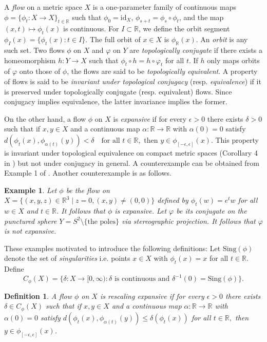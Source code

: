 \documentclass[11pt,letterpaper]{amsart}
\newtheorem{definition}{Definition}[section]
\newtheorem{ex}{Example}[section]
\begin{document}
A {\em flow} on a metric space $X$ is a one-parameter family of continuous maps $\phi = \{\phi_t : X \to X\}_{t \in \mathbb{R}}$ such that $\phi_0 = \mathrm{id}_X$, $\phi_{s+t} = \phi_s \circ \phi_t$, and the map $(x, t) \mapsto \phi_t(x)$ is continuous. For $I \subset \mathbb{R}$, we define the orbit segment $\phi_I(x) = \{\phi_t(x) : t \in I\}$. The full orbit of $x \in X$ is $\phi_{\mathbb{R}}(x)$. An {\em orbit} is any such set.
Two flows $\phi$ on $X$ and $\varphi$ on $Y$ are {\em topologically conjugate} if there exists a homeomorphism $h : Y \to X$ such that $\phi_t \circ h = h \circ \varphi_t$ for all $t$. If $h$ only maps orbits of $\varphi$ onto those of $\phi$, the flows are said to be {\em topologically equivalent}.
A property of flows is said to be {\em invariant under topological conjugacy} (resp. {\em equivalence}) if it is preserved under topologically conjugate (resp. equivalent) flows. Since conjugacy implies equivalence, the latter invariance implies the former.

On the other hand, a flow $\phi$ on $X$ is {\em expansive} if for every $\epsilon > 0$ there exists $\delta > 0$ such that if $x, y \in X$ and a continuous map $\alpha : \mathbb{R} \to \mathbb{R}$ with $\alpha(0) = 0$ satisfy
$d(\phi_t(x), \phi_{\alpha(t)}(y)) < \delta \quad \text{for all } t\in\mathbb{R},$
then $y \in \phi_{[-\epsilon,\epsilon]}(x)$. This property is invariant under topological equivalence on compact metric spaces (Corollary 4 in \cite{bw}) but not under conjugacy in general. A counterexample can be obtained from Example 1 of \cite{jny}. Another counterexample is as follows.

\begin{ex}
\label{jimmy}
Let $\phi$ be the flow on $X=\{(x,y,z)\in \mathbb{R}^3\mid z=0, (x,y)\neq(0,0)\}$ defined by $\phi_t(w) = e^tw$ for all $w\in X$ and $t\in\mathbb{R}$.
It follows that $\phi$ is expansive.
Let $\varphi$ be its conjugate on the punctured sphere $Y = S^2 \setminus \{\mbox{the poles}\}$ via stereographic projection. It follows that $\varphi$ is not expansive.
\end{ex}

These examples motivated \cite{jny} to introduce the following definitions:
Let $\mathrm{Sing}(\phi)$ denote the set of {\em singularities} i.e. points $x\in X$ with $\phi_t(x)=x$ for all $t\in\mathbb{R}$. Define
$$
C_\phi(X) = \{ \delta:X\to [0,\infty): \delta\mbox{ is continuous and }\delta^{-1}(0) = \mathrm{Sing}(\phi) \}.
$$
\begin{definition}
A flow $\phi$ on $X$ is {\em rescaling expansive} if
for every $\epsilon > 0$ there exists $\delta \in C_\phi(X)$ such that if $x, y \in X$ and a continuous map $\alpha : \mathbb{R} \to \mathbb{R}$ with $\alpha(0) = 0$ satisfy
$d(\phi_t(x), \phi_{\alpha(t)}(y)) \leq \delta(\phi_t(x))$ for all $t\in\mathbb{R},$
then $y \in \phi_{[-\epsilon,\epsilon]}(x)$.
\end{definition}
\end{document}
